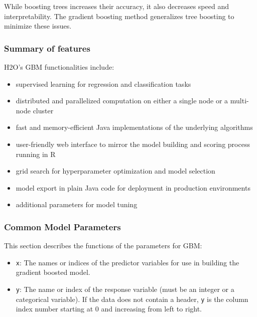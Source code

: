 \documentclass{article}[11pt]
\begin{document}
{While boosting trees increases their accuracy, it also decreases speed and interpretability. The gradient boosting method generalizes tree boosting to minimize these issues. 

\subsubsection{Summary of features} 
H2O's GBM functionalities include:

\begin{itemize}

\item supervised learning for regression and classification tasks

\item distributed and parallelized computation on either a single node or a multi-node cluster

\item fast and memory-efficient Java implementations of the underlying algorithms

\item user-friendly web interface to mirror the model building and scoring process running in R

\item grid search for hyperparameter optimization and model selection

\item model export in plain Java code for deployment in production environments

\item additional parameters for model tuning

\end{itemize}

\subsubsection{Common Model Parameters}

This section describes the functions of the parameters for GBM: 

\begin{itemize}

\item {\texttt{x}}: The names or indices of the predictor variables for use in building the gradient boosted model. 

\item {\texttt{y}}: The name or index of the response variable (must be an integer or a categorical variable). If the data does not contain a header, {\texttt{y}} is the column index number starting at 0 and increasing from left to right. 


\end{itemize}}
\end{document}
